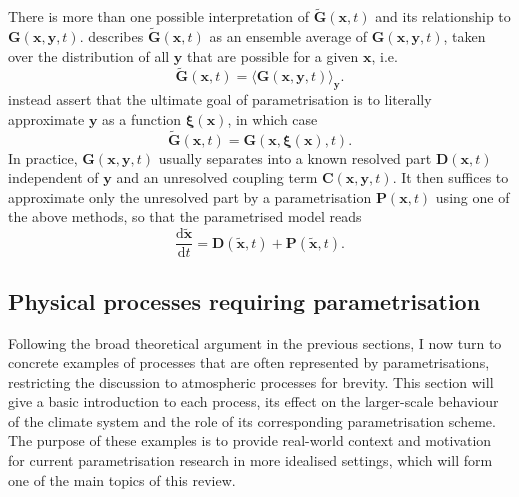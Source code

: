 \documentclass[titlepage,twoside]{article}
\numberwithin{equation}{section}
\newcommand{\diff}[2]{\frac{\mathrm{d} #1}{\mathrm{d} #2}}
\renewcommand\vec{\bm}
\begin{document}
There is more than one possible interpretation of $\tilde{\vec{G}}(\vec{x},t)$ and
its relationship to $\vec{G}(\vec{x},\vec{y},t)$. \textcite{hasselmann1976}
describes $\tilde{\vec{G}}(\vec{x},t)$ as an ensemble average of
$\vec{G}(\vec{x},\vec{y},t)$, taken over the distribution of all $\vec{y}$ that
are possible for a given $\vec{x}$, i.e.
\begin{equation*}
    \tilde{\vec{G}}(\vec{x},t)
        = \langle \vec{G}(\vec{x},\vec{y},t) \rangle_{\vec{y}}.
\end{equation*}
\textcite{demaeyer2018} instead assert that the ultimate goal of
parametrisation is to literally approximate $\vec{y}$ as a function
$\vec{\xi}(\vec{x})$, in which case
\begin{equation*}
    \tilde{\vec{G}}(\vec{x},t)
        = \vec{G}(\vec{x},\vec{\xi}(\vec{x}),t).
\end{equation*}
In practice, $\vec{G}(\vec{x},\vec{y},t)$ usually separates into a known
resolved part $\vec{D}(\vec{x},t)$ independent of $\vec{y}$ and an unresolved
coupling term $\vec{C}(\vec{x},\vec{y},t)$. It then suffices to approximate
only the unresolved part by a parametrisation $\vec{P}(\vec{x}, t)$ using one
of the above methods, so that the parametrised model reads
\begin{equation} \label{eqn:parametrised_model}
    \diff{\tilde{\vec{x}}}{t}
        = \vec{D}(\tilde{\vec{x}},t) + \vec{P}(\tilde{\vec{x}}, t).
\end{equation}


\subsection{Physical processes requiring parametrisation}
Following the broad theoretical argument in the previous sections, I now turn to
concrete examples of processes that are often represented by parametrisations,
restricting the discussion to atmospheric processes for brevity. This section
will give a basic introduction to each process, its effect on the larger-scale
behaviour of the climate system and the role of its corresponding
parametrisation scheme. The purpose of these examples is to provide real-world
context and motivation for current parametrisation research in more idealised
settings, which will form one of the main topics of this review.
\end{document}
